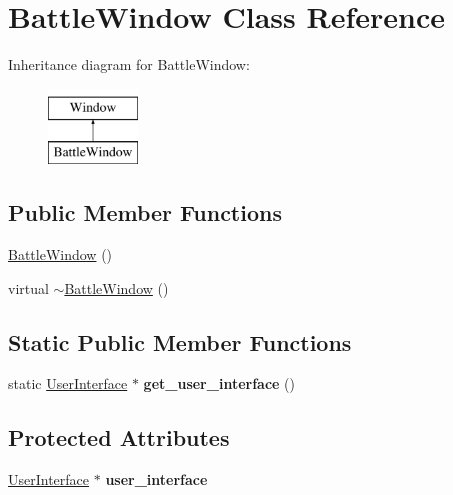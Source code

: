 \hypertarget{classBattleWindow}{}\section{Battle\+Window Class Reference}
\label{classBattleWindow}
Inheritance diagram for Battle\+Window\+:\begin{figure}[H]
\begin{center}
\leavevmode
\includegraphics[height=2.000000cm]{classBattleWindow}
\end{center}
\end{figure}
\subsection*{Public Member Functions}
\begin{DoxyCompactItemize}
\item 
\mbox{\hyperlink{classBattleWindow_a9f7e70c225b63503da672c0c6eab0c08}{Battle\+Window}} ()
\item 
virtual \mbox{\hyperlink{classBattleWindow_a1407b4532e34b603c8353907b6bed45a}{$\sim$\+Battle\+Window}} ()
\end{DoxyCompactItemize}
\subsection*{Static Public Member Functions}
\begin{DoxyCompactItemize}
\item 
\mbox{\label{classBattleWindow_a541e688bbf9de6a9e694ae6873bd7eec}} 
static \mbox{\hyperlink{classUserInterface}{User\+Interface}} $\ast$ {\bfseries get\+\_\+user\+\_\+interface} ()
\end{DoxyCompactItemize}
\subsection*{Protected Attributes}
\begin{DoxyCompactItemize}
\item 
\mbox{\label{classBattleWindow_a4edfdbf430dff202ff490b218db4572c}} 
\mbox{\hyperlink{classUserInterface}{User\+Interface}} $\ast$ {\bfseries user\+\_\+interface}
\end{DoxyCompactItemize}


